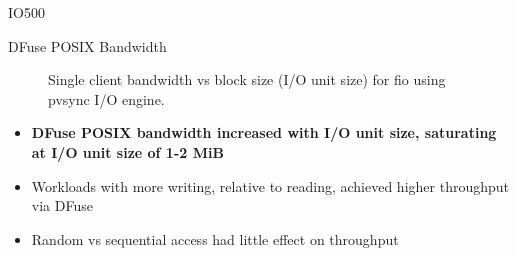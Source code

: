 \documentclass[final]{beamer}
\newlength{\colwidth}
\begin{document}
\begin{frame}[t, fragile]
\begin{columns}[t]
\begin{column}{\colwidth}
\begin{block}{IO500}
  \end{block}

  \begin{block}{DFuse POSIX Bandwidth}

    
    
    \begin{figure}
      \centering
         
      \caption{Single client bandwidth vs block size (I/O unit size) for fio using pvsync I/O engine.}
      \label{fig:fio_bw_vs_bs_hueRW_nj-16_iod-16}
    \end{figure}
    \normalsize{
    \begin{itemize}
      \item \textbf{DFuse POSIX bandwidth increased with I/O unit size, saturating at I/O unit size of 1-2 MiB}
      \item Workloads with more writing, relative to reading, achieved higher throughput via DFuse
      \item Random vs sequential access had little effect on throughput
    \end{itemize}
    }
    


\end{block}
\end{column}
\end{columns}
\end{frame}
\end{document}
